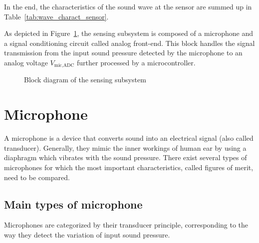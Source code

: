 \documentclass{EPL-master-thesis-covers-EN}
\newcommand{\te}[1]{\textrm{#1}}
\begin{document}
In the end, the characteristics of the sound wave at the sensor are summed up in Table~\ref{tab:wave_charact_sensor}.

\begin{table}[H]
\centering
{}
\caption{Sound wave characteristics at the sensor}
\label{tab:wave_charact_sensor}
\end{table}


As depicted in Figure~\ref{fig:sensing_subsystem}, the sensing subsystem is composed of a microphone and a signal conditioning circuit called analog front-end. This block handles the signal transmission from the input sound pressure detected by the microphone to an analog voltage $V_{\te{mic,ADC}}$ further processed by a microcontroller.

\begin{figure}[H]
\centering
{}
\caption{Block diagram of the sensing subsystem}
\label{fig:sensing_subsystem}
\end{figure}

\section{Microphone}

A microphone is a device that converts sound into an electrical signal (also called transducer). Generally, they mimic the inner workings of human ear by using a diaphragm which vibrates with the sound pressure. There exist several types of microphones for which the most important characteristics, called figures of merit, need to be compared.


\subsection*{Main types of microphone}

Microphones are categorized by their transducer principle, corresponding to the way they detect the variation of input sound pressure.
\end{document}
